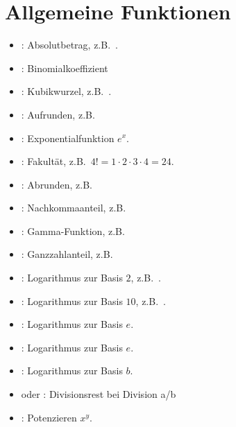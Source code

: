 \chapter{Allgemeine Funktionen}

\begin{itemize}

\item
{}:
Absolutbetrag, z.B.\ .

\item
{}:
Binomialkoeffizient

\item
{}:
Kubikwurzel, z.B.\ .

\item
{}:
Aufrunden, z.B.\ 

\item
{}:
Exponentialfunktion $e^x$.

\item
{}:
Fakultät, z.B.\ $4!=1\cdot2\cdot3\cdot4=24$.

\item
{}:
Abrunden, z.B.\ 

\item
{}:
Nachkommaanteil, z.B.\ 

\item
{}:
Gamma-Funktion, z.B.\ 

\item
{}:
Ganzzahlanteil, z.B.\ 

\item
{}:
Logarithmus zur Basis $2$, z.B.\ .

\item
{}:
Logarithmus zur Basis $10$, z.B.\ .

\item
{}:
Logarithmus zur Basis $e$.

\item
{}:
Logarithmus zur Basis $e$.

\item
{}:
Logarithmus zur Basis $b$.

\item
{} oder :
Divisionsrest bei Division a/b

\item
{}:
Potenzieren $x^y$.


\end{itemize}

